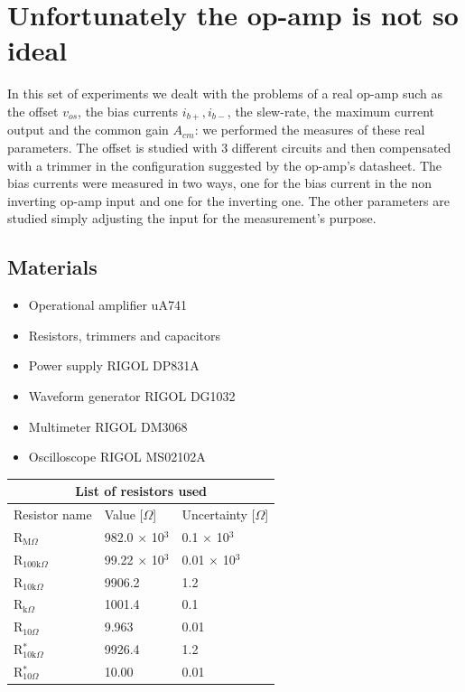 \chapter{Unfortunately the op-amp is not so ideal}
In this set of experiments we dealt with the problems of a real op-amp such as the offset $v_{os}$, the bias currents $i_{b+},i_{b-}$, the slew-rate, the maximum current output and the common gain $A_{cm}$: we performed the measures of these real parameters. The offset is studied with 3 different circuits and then compensated with a trimmer in the configuration suggested by the op-amp's datasheet. The bias currents were measured in two ways, one for the bias current in the non inverting op-amp input and one for the inverting one. The other parameters are studied simply adjusting the input for the measurement's purpose.

\section{Materials}
\begin{itemize}
\item Operational amplifier uA741
\item Resistors, trimmers and capacitors
\item Power supply RIGOL DP831A
\item Waveform generator RIGOL DG1032
\item Multimeter RIGOL DM3068
\item Oscilloscope RIGOL MS02102A
\end{itemize}
\begin{table}[H]
\centering
\begin{tabular}{ |p{3cm}||p{3cm}|p{3cm}| }
 \hline
 \multicolumn{3}{|c|}{List of resistors used} \\
 \hline
 Resistor name & Value [$\Omega$] & Uncertainty [$\Omega$]\\
 \hline
 R$_{\text{M}\Omega}$   & 982.0 $\times$ 10$^3$ & 0.1 $\times$ 10$^3$  \\
 R$_{100\text{k}\Omega}$& 99.22 $\times$ 10$^3$ & 0.01 $\times$ 10$^3$ \\
 R$_{10\text{k}\Omega}$ &   9906.2            & 1.2         \\
 R$_{\text{k}\Omega}$   &  1001.4             & 0.1         \\
 R$_{10\Omega}$         &  9.963              & 0.01        \\
 R$_{10\text{k}\Omega}^*$ &  9926.4             & 1.2         \\
 R$_{10\Omega}^*$       &10.00                & 0.01        \\ 
 \hline
\end{tabular}
\end{table}

